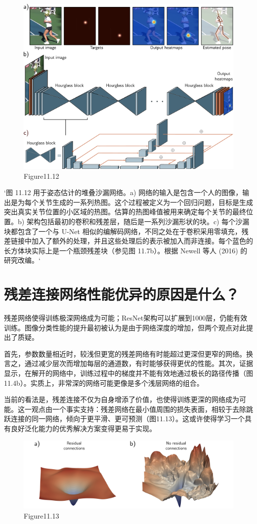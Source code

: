 \begin{figure}[h!]
\centering
\includegraphics[width=0.7\linewidth]{png/chapter11/ResidualStackedHourglass.png}
\caption{Figure11.12}
\end{figure}

`图 11.12 用于姿态估计的堆叠沙漏网络。a) 网络的输入是包含一个人的图像，输出是为每个关节生成的一系列热图。这个过程被定义为一个回归问题，目标是生成突出真实关节位置的小区域的热图。估算的热图峰值被用来确定每个关节的最终位置。b) 架构包括最初的卷积和残差层，随后是一系列沙漏形状的块。c) 每个沙漏块都包含了一个与 U-Net 相似的编解码网络，不同之处在于卷积采用零填充，残差链接中加入了额外的处理，并且这些处理后的表示被加入而非连接。每个蓝色的长方体块实际上是一个瓶颈残差块（参见图 11.7b）。根据 Newell 等人 (2016) 的研究改编。`

\section{残差连接网络性能优异的原因是什么？}
残差网络使得训练极深网络成为可能；ResNet架构可以扩展到1000层，仍能有效训练。图像分类性能的提升最初被认为是由于网络深度的增加，但两个观点对此提出了质疑。

首先，参数数量相近时，较浅但更宽的残差网络有时能超过更深但更窄的网络。换言之，通过减少层次而增加每层的通道数，有时能够获得更优的性能。其次，证据显示，在解开的网络中，训练过程中的梯度并不能有效地通过极长的路径传播（图11.4b）。实质上，非常深的网络可能更像是多个浅层网络的组合。

当前的看法是，残差连接不仅为自身增添了价值，也使得训练更深的网络成为可能。这一观点由一个事实支持：残差网络在最小值周围的损失表面，相较于去除跳跃连接的同一网络，倾向于更平滑、更可预测（图11.13）。这或许使得学习一个具有良好泛化能力的优秀解决方案变得更易于实现。

\begin{figure}[h!]
\centering
\includegraphics[width=0.7\linewidth]{png/chapter11/ResidualSurface.png}
\caption{Figure11.13}
\end{figure}

